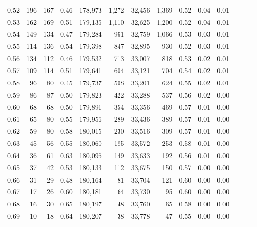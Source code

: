 \begin{tabular}{rrrrrrrrrrrrrr}
0.52 &     196 &    167 &  0.46 &  178,973 &    1,272 &  32,456 &   1,369 &  0.52 &  0.04 &      0.01 \\
0.53 &     162 &    169 &  0.51 &  179,135 &    1,110 &  32,625 &   1,200 &  0.52 &  0.04 &      0.01 \\
0.54 &     149 &    134 &  0.47 &  179,284 &      961 &  32,759 &   1,066 &  0.53 &  0.03 &      0.01 \\
0.55 &     114 &    136 &  0.54 &  179,398 &      847 &  32,895 &     930 &  0.52 &  0.03 &      0.01 \\
0.56 &     134 &    112 &  0.46 &  179,532 &      713 &  33,007 &     818 &  0.53 &  0.02 &      0.01 \\
0.57 &     109 &    114 &  0.51 &  179,641 &      604 &  33,121 &     704 &  0.54 &  0.02 &      0.01 \\
0.58 &      96 &     80 &  0.45 &  179,737 &      508 &  33,201 &     624 &  0.55 &  0.02 &      0.01 \\
0.59 &      86 &     87 &  0.50 &  179,823 &      422 &  33,288 &     537 &  0.56 &  0.02 &      0.00 \\
0.60 &      68 &     68 &  0.50 &  179,891 &      354 &  33,356 &     469 &  0.57 &  0.01 &      0.00 \\
0.61 &      65 &     80 &  0.55 &  179,956 &      289 &  33,436 &     389 &  0.57 &  0.01 &      0.00 \\
0.62 &      59 &     80 &  0.58 &  180,015 &      230 &  33,516 &     309 &  0.57 &  0.01 &      0.00 \\
0.63 &      45 &     56 &  0.55 &  180,060 &      185 &  33,572 &     253 &  0.58 &  0.01 &      0.00 \\
0.64 &      36 &     61 &  0.63 &  180,096 &      149 &  33,633 &     192 &  0.56 &  0.01 &      0.00 \\
0.65 &      37 &     42 &  0.53 &  180,133 &      112 &  33,675 &     150 &  0.57 &  0.00 &      0.00 \\
0.66 &      31 &     29 &  0.48 &  180,164 &       81 &  33,704 &     121 &  0.60 &  0.00 &      0.00 \\
0.67 &      17 &     26 &  0.60 &  180,181 &       64 &  33,730 &      95 &  0.60 &  0.00 &      0.00 \\
0.68 &      16 &     30 &  0.65 &  180,197 &       48 &  33,760 &      65 &  0.58 &  0.00 &      0.00 \\
0.69 &      10 &     18 &  0.64 &  180,207 &       38 &  33,778 &      47 &  0.55 &  0.00 &      0.00 \\

\end{tabular}
